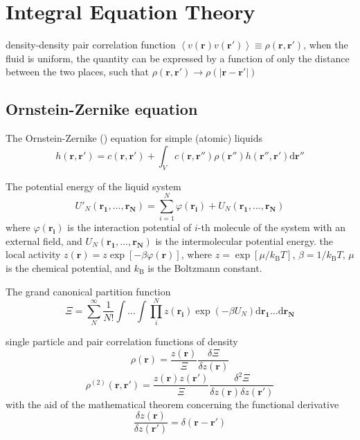 
\chapter{Integral Equation Theory\label{chpt:iem}}

density-density pair correlation function $\left\langle v(\mathbf{r})v(\mathbf{r'})\right\rangle \equiv\rho(\mathbf{r},\mathbf{r'})$,
when the fluid is uniform, the quantity can be expressed by a function
of only the distance between the two places, such that $\rho(\mathbf{r},\mathbf{r'})\rightarrow\rho(\left|\mathbf{r}-\mathbf{r'}\right|)$\citep{hirata_molecular_2004}


\section{Ornstein-Zernike equation}

The Ornstein-Zernike () equation for simple (atomic) liquids
\begin{equation}
h(\mathbf{r},\mathbf{r'})=c(\mathbf{r},\mathbf{r'})+\int_{V}c(\mathbf{r},\mathbf{r''})\rho(\mathbf{r''})h(\mathbf{r''},\mathbf{r'})\mathrm{d}\mathbf{r''}
\end{equation}


The potential energy of the liquid system
\begin{equation}
U'_{N}(\mathbf{r_{1}},\ldots,\mathbf{r_{N}})=\sum_{i=1}^{N}\varphi(\mathbf{r_{i}})+U_{N}(\mathbf{r_{1}},\ldots,\mathbf{r_{N}})
\end{equation}
where $\varphi(\mathbf{r_{i}})$ is the interaction potential of $i$-th
molecule of the system with an external field, and $U_{N}(\mathbf{r_{1}},\ldots,\mathbf{r_{N}})$
is the intermolecular potential energy. the local activity $z(\mathbf{r})=z\exp\left[-\beta\varphi(\mathbf{r})\right]$,
where $z=\exp\left[\mu/k_{\mathrm{B}}T\right]$, $\beta=1/k_{\mathrm{B}}T$,
$\mu$ is the chemical potential, and $k_{\mathrm{B}}$ is the Boltzmann
constant.

The grand canonical partition function
\begin{equation}
\Xi=\sum_{N}^{\infty}\frac{1}{N!}\int\ldots\int\prod_{i}^{N}z(\mathbf{r_{i}})\exp\left(-\beta U_{N}\right)\mathrm{d}\mathbf{r_{1}}\ldots\mathrm{d}\mathbf{r_{N}}
\end{equation}


single particle and pair correlation functions of density
\begin{equation}
\rho(\mathbf{r})=\frac{z(\mathbf{r})}{\Xi}\frac{\delta\Xi}{\delta z(\mathbf{r})}
\end{equation}
\begin{equation}
\rho^{(2)}(\mathbf{r},\mathbf{r}')=\frac{z(\mathbf{r})z(\mathbf{r}')}{\Xi}\frac{\delta^{2}\Xi}{\delta z(\mathbf{r})\delta z(\mathbf{r}')}
\end{equation}
with the aid of the mathematical theorem concerning the functional
derivative 
\begin{equation}
\frac{\delta z(\mathbf{r})}{\delta z(\mathbf{r}')}=\delta(\mathbf{r}-\mathbf{r}')
\end{equation}


